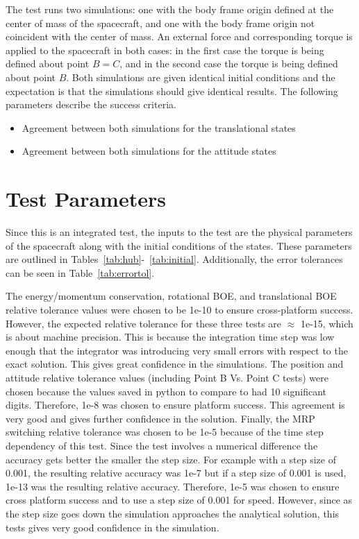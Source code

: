 The test runs two simulations: one with the body frame origin defined at the center of mass of the spacecraft, and one with the body frame origin not coincident with the center of mass. An external force and corresponding torque is applied to the spacecraft in both cases: in the first case the torque is being defined about point $B=C$, and in the second case the torque is being defined about point $B$. Both simulations are given identical initial conditions and the expectation is that the simulations should give identical results. The following parameters describe the success criteria.
\begin{itemize}
	\item Agreement between both simulations for the translational states
	\item Agreement between both simulations for the attitude states
\end{itemize}

\section{Test Parameters}

Since this is an integrated test, the inputs to the test are the physical parameters of the spacecraft along with the initial conditions of the states. These parameters are outlined in Tables~\ref{tab:hub}-~\ref{tab:initial}. Additionally, the error tolerances can be seen in Table~\ref{tab:errortol}.

The energy/momentum conservation, rotational BOE, and translational BOE relative tolerance values were chosen to be 1e-10 to ensure cross-platform success. However, the expected relative tolerance for these three tests are $\approx$ 1e-15, which is about machine precision. This is because the integration time step was low enough that the integrator was introducing very small errors with respect to the exact solution. This gives great confidence in the simulations. The position and attitude relative tolerance values (including Point B Vs. Point C tests) were chosen because the values saved in python to compare to had 10 significant digits. Therefore, 1e-8 was chosen to ensure platform success. This agreement is very good and gives further confidence in the solution. Finally, the MRP switching relative tolerance was chosen to be 1e-5 because of the time step dependency of this test. Since the test involves a numerical difference the accuracy gets better the smaller the step size. For example with a step size of 0.001, the resulting relative accuracy was 1e-7 but if a step size of 0.001 is used, 1e-13 was the resulting relative accuracy. Therefore, 1e-5 was chosen to ensure cross platform success and to use a step size of 0.001 for speed. However, since as the step size goes down the simulation approaches the analytical solution, this tests gives very good confidence in the simulation. 

